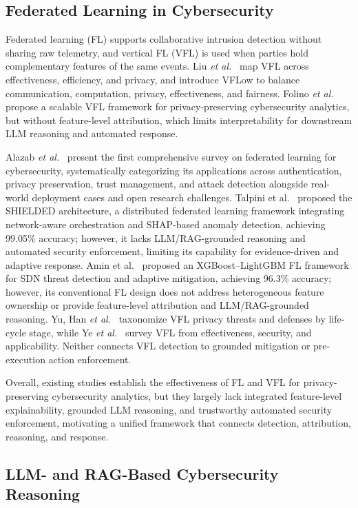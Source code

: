 \documentclass[10pt, conference]{IEEEtran}
\begin{document}
\subsection{Federated Learning in Cybersecurity}
Federated learning (FL) supports collaborative intrusion detection without sharing raw telemetry, and vertical FL (VFL) is used when parties hold complementary features of the same events. Liu \textit{et al.}~\cite{liu2024vfl} map VFL across effectiveness, efficiency, and privacy, and introduce VFLow to balance communication, computation, privacy, effectiveness, and fairness. Folino \textit{et al.}~\cite{folino2024} propose a scalable VFL framework for privacy-preserving cybersecurity analytics, but without feature-level attribution, which limits interpretability for downstream LLM reasoning and automated response.
 
Alazab \emph{et al.}~\cite{alazab2022}
present the first comprehensive survey on federated learning for cybersecurity, systematically categorizing its applications across authentication, privacy preservation, trust management, and attack detection alongside real-world deployment cases and open research challenges.  Talpini et al.~\cite{talpini2025} proposed the SHIELDED architecture, a distributed federated learning framework integrating network-aware orchestration and SHAP-based anomaly detection, achieving 99.05\% accuracy; however, it lacks LLM/RAG-grounded reasoning and automated security enforcement, limiting its capability for evidence-driven and adaptive response. Amin et al.~\cite{amin2025efficient} proposed an XGBoost--LightGBM FL framework for SDN threat detection and adaptive mitigation, achieving 96.3\% accuracy; however, its conventional FL design does not address heterogeneous feature ownership or provide feature-level attribution and LLM/RAG-grounded reasoning. Yu, Han \textit{et al.}~\cite{yu2024vflprivacy} taxonomize VFL privacy threats and defenses by life-cycle stage, while Ye \textit{et al.}~\cite{ye2024vfl} survey VFL from effectiveness, security, and applicability. Neither connects VFL detection to grounded mitigation or pre-execution action enforcement.

Overall, existing studies establish the effectiveness of FL and VFL for privacy-preserving cybersecurity analytics, but they largely lack integrated feature-level explainability, grounded LLM reasoning, and trustworthy automated security enforcement, motivating a unified framework that connects detection, attribution, reasoning, and response.

\subsection{LLM- and RAG-Based Cybersecurity Reasoning}
\end{document}
